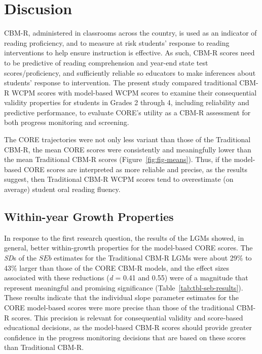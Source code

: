 \documentclass[
  english,
  man, fleqn, noextraspace]{apa6}
\begin{document}
\hypertarget{discusion}{%
\section{Discusion}\label{discusion}}

CBM-R, administered in classrooms across the country, is used as an indicator of reading proficiency, and to measure at risk students' response to reading interventions to help ensure instruction is effective. As such, CBM-R scores need to be predictive of reading comprehension and year-end state test scores/proficiency, and sufficiently reliable so educators to make inferences about students' response to intervention. The present study compared traditional CBM-R WCPM scores with model-based WCPM scores to examine their consequential validity properties for students in Grades 2 through 4, including reliability and predictive performance, to evaluate CORE's utility as a CBM-R assessment for both progress monitoring and screening.

The CORE trajectories were not only less variant than those of the Traditional CBM-R, the mean CORE scores were consistently and meaningfully lower than the mean Traditional CBM-R scores (Figure~\ref{fig:fig-means}). Thus, if the model-based CORE scores are interpreted as more reliable and precise, as the results suggest, then Traditional CBM-R WCPM scores tend to overestimate (on average) student oral reading fluency.

\hypertarget{within-year-growth-properties}{%
\subsection{Within-year Growth Properties}\label{within-year-growth-properties}}

In response to the first research question, the results of the LGMs showed, in general, better within-growth properties for the model-based CORE scores. The \emph{SD}s of the \(SEb\) estimates for the Traditional CBM-R LGMs were about 29\% to 43\% larger than those of the CORE CBM-R models, and the effect sizes associated with these reductions (\emph{d} = 0.41 and 0.55) were of a magnitude that represent meaningful and promising significance (Table~\ref{tab:tbl-seb-results}). These results indicate that the individual slope parameter estimates for the CORE model-based scores were more precise than those of the traditional CBM-R scores. This precision is relevant for consequential validity and score-based educational decisions, as the model-based CBM-R scores should provide greater confidence in the progress monitoring decisions that are based on these scores than Traditional CBM-R.
\end{document}
